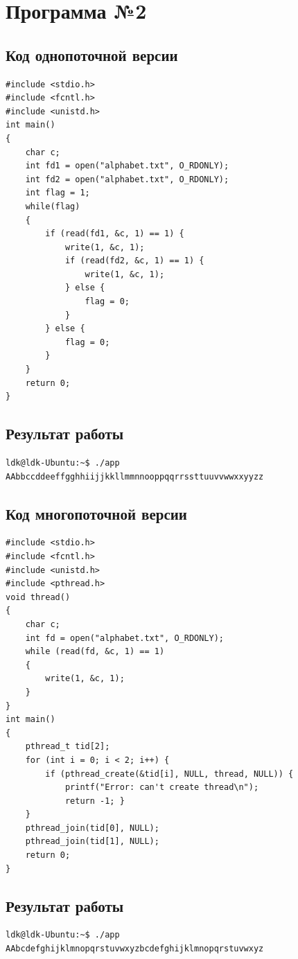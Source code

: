 \documentclass[12pt]{report}
\begin{document}
\section*{Программа №2}
\subsection*{Код однопоточной версии}
\begin{lstlisting}
#include <stdio.h>
#include <fcntl.h>
#include <unistd.h>
int main()
{
    char c;
    int fd1 = open("alphabet.txt", O_RDONLY);
    int fd2 = open("alphabet.txt", O_RDONLY);
    int flag = 1;
    while(flag)
    {
        if (read(fd1, &c, 1) == 1) {
            write(1, &c, 1);
            if (read(fd2, &c, 1) == 1) {
                write(1, &c, 1);
            } else {
                flag = 0;
            }
        } else {
            flag = 0;
        }
    }
    return 0;
}
\end{lstlisting}

\subsection*{Результат работы}
\begin{lstlisting}
ldk@ldk-Ubuntu:~$ ./app
AAbbccddeeffgghhiijjkkllmmnnooppqqrrssttuuvvwwxxyyzz
\end{lstlisting}

\newpage
\subsection*{Код многопоточной версии}
\begin{lstlisting}
#include <stdio.h>
#include <fcntl.h>
#include <unistd.h>
#include <pthread.h>
void thread()
{
    char c;
    int fd = open("alphabet.txt", O_RDONLY);
    while (read(fd, &c, 1) == 1)
    {
        write(1, &c, 1);
    }
}
int main()
{
    pthread_t tid[2];
    for (int i = 0; i < 2; i++) {
        if (pthread_create(&tid[i], NULL, thread, NULL)) {
            printf("Error: can't create thread\n");
            return -1; }
    }
    pthread_join(tid[0], NULL);
    pthread_join(tid[1], NULL);
    return 0;
}
\end{lstlisting}

\subsection*{Результат работы}
\begin{lstlisting}
ldk@ldk-Ubuntu:~$ ./app
AAbcdefghijklmnopqrstuvwxyzbcdefghijklmnopqrstuvwxyz
\end{lstlisting}
\end{document}
